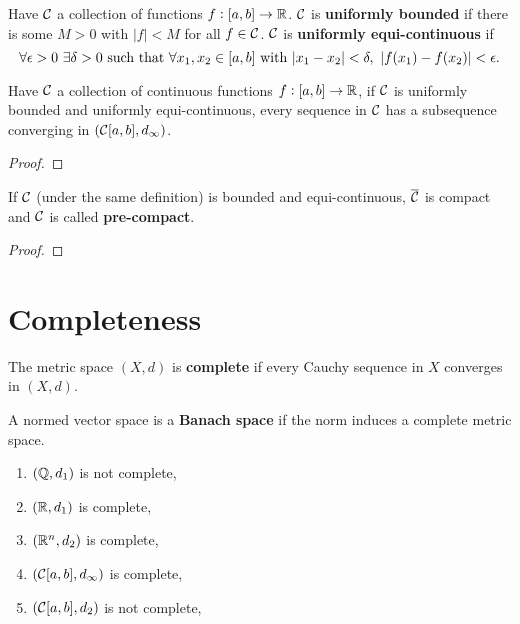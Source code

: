 \documentclass[../Year2.tex]{subfiles}
\begin{document}
\begin{definition}
    Have $\mathcal{C}$ a collection of functions $f:[a,b]\rightarrow\mathbb{R}$. $\mathcal{C}$ is \textbf{uniformly bounded} if there is some $M>0$ with $|f|<M$ for all $f\in\mathcal{C}$. $\mathcal{C}$ is \textbf{uniformly equi-continuous} if \[
        \forall \epsilon>0 \ \exists\delta>0 \ \text{\textcolor{black}{such that }} \forall x_1,x_2\in[a,b] \ \text{\textcolor{black}{with }} |x_1-x_2|<\delta, \
        |f(x_1)-f(x_2)|<\epsilon \text{\textcolor{black}{.}}
    \]
\end{definition}

\vspace{-20pt}

\begin{theorem}
    Have $\mathcal{C}$ a collection of continuous functions $f:[a,b]\rightarrow\mathbb{R}$, if $\mathcal{C}$ is uniformly bounded and uniformly equi-continuous, every sequence in $\mathcal{C}$ has a subsequence converging in $(\mathcal{C}[a,b],d_\infty)$. \begin{proof}
        
    \end{proof}
\end{theorem}

\begin{corollary}
    If $\mathcal{C}$ (under the same definition) is bounded and equi-continuous, $\overline{\mathcal{C}}$ is compact and $\mathcal{C}$ is called \textbf{pre-compact}. \begin{proof}
        
    \end{proof}
\end{corollary}

\section{Completeness}

\begin{definition}
    The metric space $(X,d)$ is \textbf{complete} if every Cauchy sequence in $X$ converges in $(X,d)$.
\end{definition}

\begin{definition}
    A normed vector space is a \textbf{Banach space} if the norm induces a complete metric space.
\end{definition}

\begin{examples}
    \begin{enumerate}
        \item $(\mathbb{Q},d_1)$ is not complete,
        \item $(\mathbb{R},d_1)$ is complete,
        \item $(\mathbb{R}^n,d_2)$ is complete,
        \item $(\mathcal{C}[a,b],d_\infty)$ is complete,
        \item $(\mathcal{C}[a,b],d_2)$ is not complete,
    \end{enumerate}
\end{examples}
\end{document}
